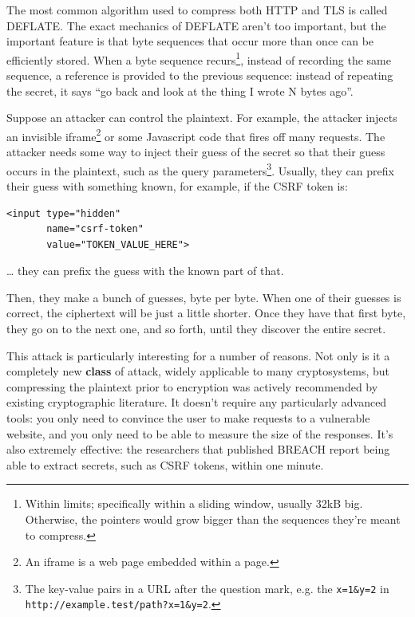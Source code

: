 \documentclass[11pt,ebook,table,dvipsnames]{memoir}
\begin{document}
The most common algorithm used to compress both HTTP and
TLS\cite{rfc3749:tlscompression} is called DEFLATE. The exact
mechanics of DEFLATE aren't too important, but the important feature
is that byte sequences that occur more than once can be efficiently
stored. When a byte sequence recurs\footnote{Within limits; specifically
within a sliding window, usually 32kB big. Otherwise, the pointers
would grow bigger than the sequences they're meant to compress.},
instead of recording the same sequence, a reference is provided to the
previous sequence: instead of repeating the secret, it says \enquote{go back
and look at the thing I wrote N bytes ago}.

Suppose an attacker can control the plaintext. For example, the
attacker injects an invisible iframe\footnote{An iframe is a web page
embedded within a page.} or some Javascript code that fires off many
requests. The attacker needs some way to inject their guess of the
secret so that their guess occurs in the plaintext, such as the query
parameters\footnote{The key-value pairs in a URL after the question mark,
e.g. the \texttt{x=1\&y=2} in \texttt{http://example.test/path?x=1\&y=2}.}. Usually,
they can prefix their guess with something known, for example, if the
CSRF token is:

\begin{verbatim}
<input type="hidden"
       name="csrf-token"
       value="TOKEN_VALUE_HERE">
\end{verbatim}

\ldots{} they can prefix the guess with the known part of that.

Then, they make a bunch of guesses, byte per byte. When one of their
guesses is correct, the ciphertext will be just a little shorter.
Once they have that first byte, they go on to the next one, and so
forth, until they discover the entire secret.

This attack is particularly interesting for a number of reasons. Not
only is it a completely new \textbf{class} of attack, widely applicable to
many cryptosystems, but compressing the plaintext prior to encryption
was actively recommended by existing cryptographic literature. It
doesn't require any particularly advanced tools: you only need to
convince the user to make requests to a vulnerable website, and you
only need to be able to measure the size of the responses. It's also
extremely effective: the researchers that published BREACH report
being able to extract secrets, such as CSRF tokens, within one minute.
\end{document}
